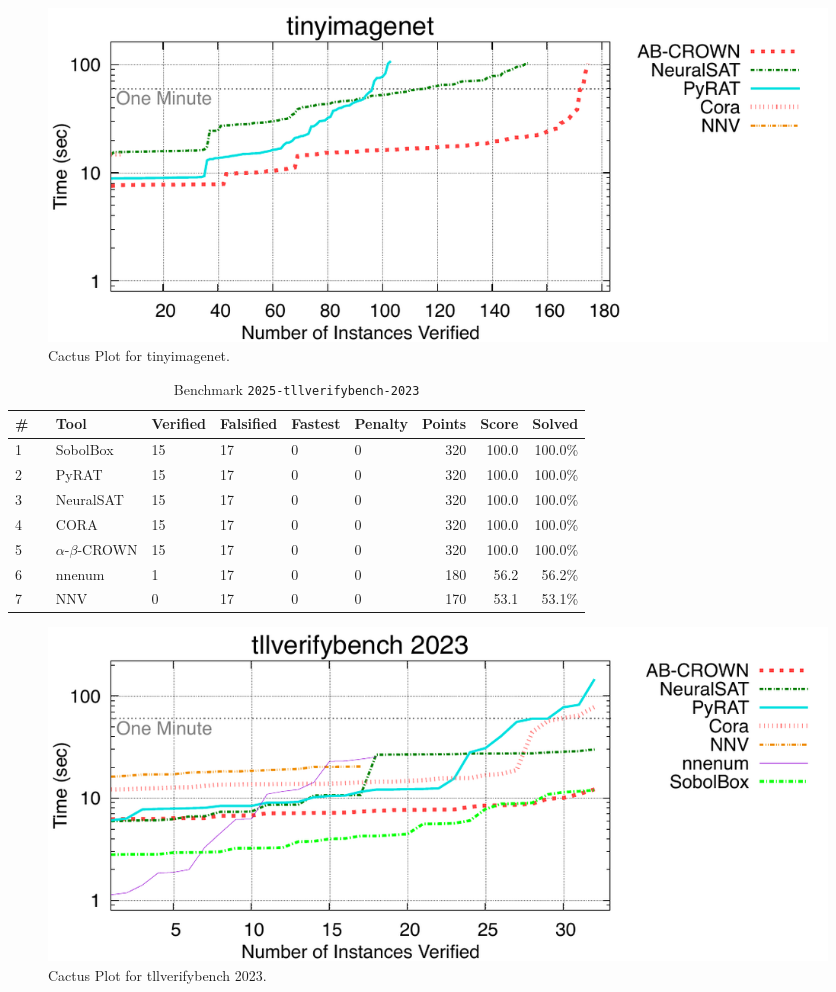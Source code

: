 \begin{figure}[h]
\centerline{\includegraphics[width=\textwidth]{cactus/2025_tinyimagenet_2024.pdf}}
\caption{Cactus Plot for tinyimagenet.}
\label{fig:quantPic}
\end{figure}


\clearpage

\begin{table}[h]
\begin{center}
\caption{Benchmark \texttt{2025-tllverifybench-2023}} \label{tab:cat_2025_tllverifybench_2023}
{\setlength{\tabcolsep}{2pt}
\begin{tabular}[h]{@{}llllllrrr@{}}
\toprule
\textbf{\# ~} & \textbf{Tool} & \textbf{Verified} & \textbf{Falsified} & \textbf{Fastest} & \textbf{Penalty} & \textbf{Points} & \textbf{Score} & \textbf{Solved}\\
\midrule
1 & SobolBox & 15 & 17 & 0 & 0 & 320 & 100.0 & 100.0\% \\
2 & PyRAT & 15 & 17 & 0 & 0 & 320 & 100.0 & 100.0\% \\
3 & NeuralSAT & 15 & 17 & 0 & 0 & 320 & 100.0 & 100.0\% \\
4 & CORA & 15 & 17 & 0 & 0 & 320 & 100.0 & 100.0\% \\
5 & $\alpha$-$\beta$-CROWN & 15 & 17 & 0 & 0 & 320 & 100.0 & 100.0\% \\
6 & nnenum & 1 & 17 & 0 & 0 & 180 & 56.2 & 56.2\% \\
7 & NNV & 0 & 17 & 0 & 0 & 170 & 53.1 & 53.1\% \\
\bottomrule
\end{tabular}
}
\end{center}
\end{table}



\begin{figure}[h]
\centerline{\includegraphics[width=\textwidth]{cactus/2025_tllverifybench_2023.pdf}}
\caption{Cactus Plot for tllverifybench 2023.}
\label{fig:quantPic}
\end{figure}

